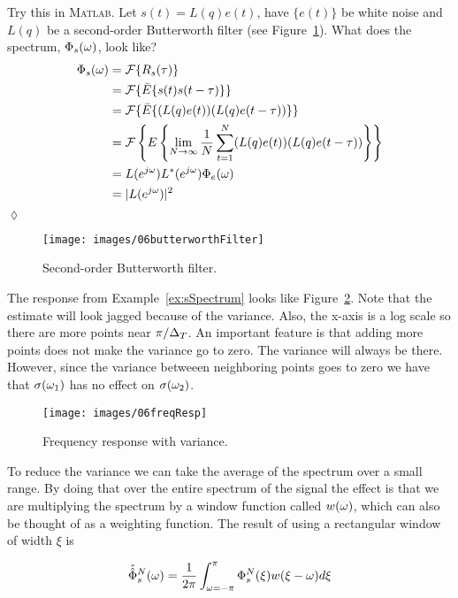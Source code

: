 \begin{example}%
\label{ex:sSpectrum}
Try this in \textsc{Matlab}.
Let $s(t)=L(q)e(t)$, have $\{e(t)\}$ be white noise and $L(q)$ be a second-order Butterworth filter (see Figure~\ref{fig:06butterworthFilter}).
What does the spectrum, $\Phi_s(\omega)$, look like?
\begin{align*}
\Phi_s(\omega) &= \mathcal{F}\{R_s(\tau)\} \\
&= \mathcal{F}\{\bar{E}\{s(t)s(t-\tau)\}\} \\
&= \mathcal{F}\{\bar{E}\{(L(q)e(t))(L(q)e(t-\tau))\}\} \\
&= \mathcal{F}\left\lbrace E\left\lbrace\lim_{N\to\infty}\frac{1}{N}\sum_{t=1}^N(L(q)e(t))(L(q)e(t-\tau))\right\rbrace\right\rbrace \\
&= L(e^{j\omega})L^*(e^{j\omega})\Phi_e(\omega) \\
&= |L(e^{j\omega})|^2
\end{align*}
$\lozenge$
\end{example}

\begin{figure}[ht!]
\centering
\texttt{[image: images/06butterworthFilter]}
\caption{Second-order Butterworth filter.}%
\label{fig:06butterworthFilter}
\end{figure}

The response from Example~\ref{ex:sSpectrum} looks like Figure~\ref{fig:06freqResp}.
Note that the estimate will look jagged because of the variance.
Also, the x-axis is a log scale so there are more points near $\pi/\Delta_T$.
An important feature is that adding more points does not make the variance go to zero.
The variance will always be there.
However, since the variance betweeen neighboring points goes to zero we have that $\sigma(\omega_1)$ has no effect on $\sigma(\omega_2)$.

\begin{figure}[ht!]
\centering
\texttt{[image: images/06freqResp]}
\caption{Frequency response with variance.}%
\label{fig:06freqResp}
\end{figure}

To reduce the variance we can take the average of the spectrum over a small range.
By doing that over the entire spectrum of the signal the effect is that we are multiplying the spectrum by a window function called $w(\omega)$, which can also be thought of as a weighting function.
The result of using a rectangular window of width $\xi$ is

\begin{equation*}
\hat{\hat{\Phi}}_s^N(\omega) = \frac{1}{2\pi}\int_{\omega=-\pi}^\pi \Phi_s^N(\xi)w(\xi-\omega)d\xi
\end{equation*}

